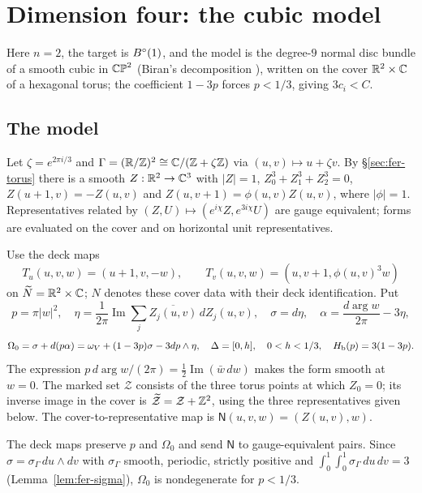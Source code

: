 \section{Dimension four: the cubic model}\label{sec:cub}

Here $n=2$, the target is $B^{\circ}(1)$, and the model is the degree-$9$ normal disc bundle of a smooth cubic in $\mathbb{CP}^2$ (Biran's decomposition \cite{Biran2001}), written on the cover $\mathbb{R}^2\times\mathbb{C}$ of a hexagonal torus; the coefficient $1-3p$ forces $p<1/3$, giving $3c_i<C$.

\subsection{The model}

Let $\zeta=e^{2\pi i/3}$ and $\Gamma=(\mathbb{R}/\mathbb{Z})^2\cong\mathbb{C}/(\mathbb{Z}+\zeta\mathbb{Z})$ via $(u,v)\mapsto u+\zeta v$. By \S\ref{sec:fer-torus} there is a smooth $Z:\mathbb{R}^2\to\mathbb{C}^3$ with $|Z|=1$, $Z_0^3+Z_1^3+Z_2^3=0$, $Z(u+1,v)=-Z(u,v)$ and $Z(u,v+1)=\phi(u,v)Z(u,v)$, where $|\phi|=1$. Representatives related by $(Z,U)\mapsto(e^{i\chi}Z,e^{3i\chi}U)$ are gauge equivalent; forms are evaluated on the cover and on horizontal unit representatives.

\begin{definition}\label{def:cub-model}
Use the deck maps
\[
 T_u(u,v,w)=(u+1,v,-w),\qquad T_v(u,v,w)=(u,v+1,\phi(u,v)^3w)
\]
on $\widetilde N=\mathbb{R}^2\times\mathbb{C}$; $N$ denotes these cover data with their deck identification.
Put
\[
 p=\pi|w|^2,\quad \eta=\frac{1}{2\pi}\operatorname{Im}\sum_j\overline{Z_j(u,v)}\,dZ_j(u,v),\quad
 \sigma=d\eta,\quad \alpha=\frac{d\arg w}{2\pi}-3\eta,
\]
\[
 \Omega_0=\sigma+d(p\alpha)
 =\omega_V+(1-3p)\sigma-3dp\wedge\eta,\quad
 \Delta=[0,h],\quad 0<h<1/3,\quad H_{\mathrm b}(p)=3(1-3p).
\]
The expression $p\,d\arg w/(2\pi)=\frac12\operatorname{Im}(\bar w\,dw)$ makes the form smooth at $w=0$.
The marked set $\mathcal Z$ consists of the three torus points at which $Z_0=0$; its inverse image in the cover is
$\widetilde{\mathcal Z}=\mathcal Z+\mathbb{Z}^2$, using the three representatives given below.
The cover-to-representative map is $\mathsf N(u,v,w)=(Z(u,v),w)$.
\end{definition}

The deck maps preserve $p$ and $\Omega_0$ and send $\mathsf N$ to gauge-equivalent pairs. Since $\sigma=\sigma_\Gamma\,du\wedge dv$ with $\sigma_\Gamma$ smooth, periodic, strictly positive and $\int_0^1\!\int_0^1\sigma_\Gamma\,du\,dv=3$ (Lemma~\ref{lem:fer-sigma}), $\Omega_0$ is nondegenerate for $p<1/3$.

